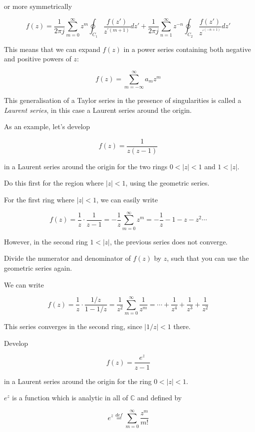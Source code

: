or more symmetrically

\begin{equation}
f(z)=\frac{1}{2 \pi j } \sum_{m=0}^{\infty} z^m \oint_{{C}_1} \frac{f(z')}{z^{\prime (m+1)}} dz' + \frac{1}{2 \pi j } \sum_{n=1}^{\infty} z ^ {-n} \oint_{{C}_2} \frac{f(z')}{z^{\prime^ {(-n+1)}}} dz'
\label{eq-laurent-int}
\end{equation} 

This means that we can expand $f(z)$ in a power series containing both negative and positive powers of $z$:

\begin{equation}
f(z)= \sum_{m=-\infty}^{\infty} a_m z^m
\end{equation} 

This generalisation of a Taylor series in the presence of singularities is called a \emph{Laurent series}, in this case a Laurent series around the origin.

As an example, let's develop

$$f(z)=\frac{1}{z(z-1)}$$

in a Laurent series around the origin for the two rings $0 < | z | < 1$ and $ 1 < |z|$.

\begin{cue}
Do this first for the region where  $| z | < 1$, using the geometric series.
\end{cue}

For the first ring where $| z | < 1$, we can easily write

$$f(z)=\frac{1}{z} \cdot \frac{1}{z-1} = -\frac{1}{z} \sum_{m=0}^{\infty} z^m =-\frac{1}{z}-1-z-z^2 \cdots$$

However, in the second ring  $ 1 < |z|$, the previous series does not converge.

\begin{cue}
Divide the numerator and denominator of $f(z)$ by $z$, such that you can use the geometric series again.
\end{cue}

We can write

$$f(z)=\frac{1}{z} \cdot \frac{1 / z }{1-1/z} = \frac{1}{z^2} \sum_{m=0}^{\infty} \frac{1}{z^m} =\cdots+\frac{1}{z^4}+\frac{1}{z^3} + \frac{1}{z^2}$$

This series converges in the second ring, since $|1/z| < 1$ there.

\begin{exer}
\label{ex_laurent_1}
Develop

$$f(z)=\frac{e^z}{z-1}$$

in a Laurent series around the origin for the ring $0 < | z | < 1$.

$e^z$ is a function which is analytic in all of $\mathbb{C}$ and defined by

$$e^z \stackrel{def}{=} \sum_{m=0}^{\infty} \frac{z^m}{m!} $$
\end{exer}

